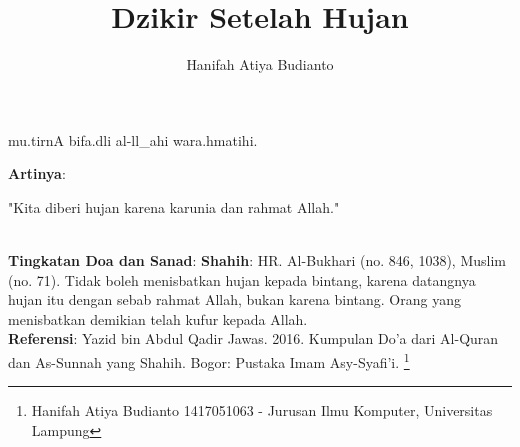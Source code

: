 \documentclass[a4paper,12pt]{article}
\title{\LARGE Dzikir Setelah Hujan}
\author{\calligra Hanifah Atiya Budianto}
\begin{document}
\sffamily
\maketitle 
\fullvocalize
{}
\begin{arabtext}
\noindent
mu.tirnA bifa.dli al-ll_ahi wara.hmatihi.\\
\end{arabtext}
\noindent
\textbf{Artinya}:
\par
\indent
"Kita diberi hujan karena karunia dan rahmat Allah."\\\\
\par
\noindent
\textbf{Tingkatan Doa dan Sanad}: \textbf{Shahih}: HR. Al-Bukhari (no. 846,
1038), Muslim (no. 71). Tidak boleh menisbatkan hujan kepada bintang, karena
datangnya hujan itu dengan sebab rahmat Allah, bukan karena bintang. Orang 
yang menisbatkan demikian telah kufur kepada Allah.\\
\textbf{Referensi}: Yazid bin Abdul Qadir Jawas. 2016. Kumpulan Do'a dari
Al-Quran dan As-Sunnah yang Shahih. Bogor: Pustaka Imam Asy-Syafi'i.
\footnote{Hanifah Atiya Budianto 1417051063 - Jurusan Ilmu Komputer,
Universitas Lampung}
\end{document}
